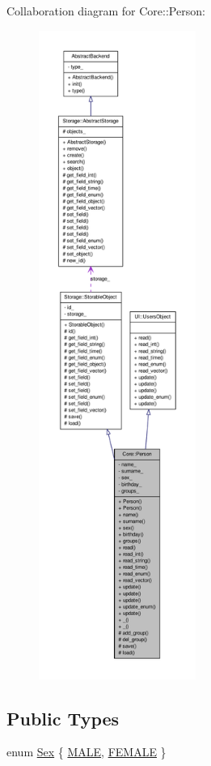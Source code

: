 Collaboration diagram for Core::Person:
\nopagebreak
\begin{figure}[H]
\begin{center}
\leavevmode
\includegraphics[height=600pt]{dc/d29/classCore_1_1Person__coll__graph}
\end{center}
\end{figure}
\subsection*{Public Types}
\begin{DoxyCompactItemize}
\item 
enum \hyperlink{classCore_1_1Person_a01e6eee93727f9ce06525eca689b4764}{Sex} \{ \hyperlink{classCore_1_1Person_a01e6eee93727f9ce06525eca689b4764aeb7355bb082d0aa0d2b315e5dfaa2de9}{MALE}, 
\hyperlink{classCore_1_1Person_a01e6eee93727f9ce06525eca689b4764a0c4f3aef529b75d197d411a6336ec3a1}{FEMALE}
 \}
\end{DoxyCompactItemize}
